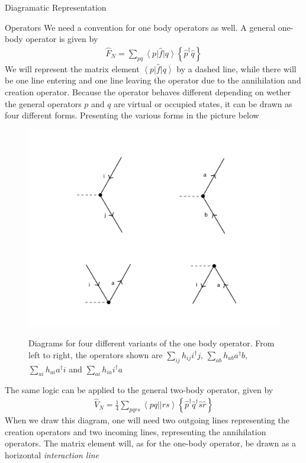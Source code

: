 \documentclass[twoside,english]{uiofysmaster}
\begin{document}
\begin{chapter}{Diagramatic Representation}
	\begin{section}{Operators}
		We need a convention for one body operators as well. A general one-body operator is given by 
		\begin{align}
			\hat F_N = \sum_{pq} \left< p \right| \hat f \left| q \right> \left\{ \hat p^\dagger \hat q \right\}
		\end{align}
		We will represent the matrix element $\left< p \right| \hat f \left| q \right>$ by a dashed line, while there will be one line entering and one line leaving the operator due to the annihilation and creation operator. Because the operator behaves different depending on wether the general operators $p$ and $q$ are virtual or occupied states, it can be drawn as four different forms. Presenting the various forms in the picture below \cite{ShavittAndBartlett}
		\begin{figure}[H]
			\includegraphics[width=\textwidth]{Figures/OneBodyOperator.pdf}
			\label{OneBodyOperator}
			\caption{Diagrams for four different variants of the one body operator. From left to right, the operators shown are $\sum_{ij} h_{ij} i^\dagger j $, $\sum_{ab} h_{ab} a^\dagger b$, $\sum_{ai}h_{ai} a^\dagger i$ and $\sum_{ai} h_{ia} i^\dagger a$}
		\end{figure}
		The same logic can be applied to the general two-body operator, given by 
		\begin{align}
			\hat V_N = \frac{1}{4} \sum_{pqrs} \left<pq||rs\right> \left\{ \hat p^\dagger \hat q^\dagger \hat s \hat r \right\}
		\end{align}
		When we draw this diagram, one will need two outgoing lines representing the creation operators and two incoming lines, representing the annihilation operators. The matrix element will, as for the one-body operator, be drawn as a horizontal \textit{interaction line}

\end{section}
\end{chapter}
\end{document}
